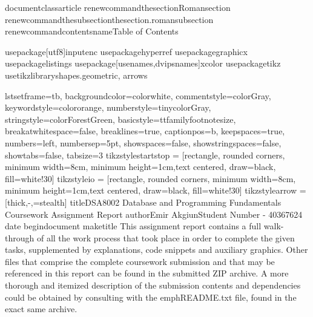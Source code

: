 documentclass{article}
renewcommandthesection{Roman{section}}
renewcommandthesubsection{thesection.roman{subsection}}
renewcommand{contentsname}{Table of Contents} 

usepackage[utf8]{inputenc}
usepackage{hyperref}
usepackage{graphicx}
usepackage{listings}
usepackage[usenames,dvipsnames]{xcolor}
usepackage{tikz}
usetikzlibrary{shapes.geometric, arrows}

lstset{frame=tb,
 backgroundcolor=color{white},   
    commentstyle=color{Gray},
    keywordstyle=color{orange},
    numberstyle=tinycolor{Gray},
    stringstyle=color{ForestGreen},
    basicstyle=ttfamilyfootnotesize,
    breakatwhitespace=false,         
    breaklines=true,                 
    captionpos=b,                    
    keepspaces=true,                 
    numbers=left,                    
    numbersep=5pt,                  
    showspaces=false,                
    showstringspaces=false,
    showtabs=false,                  
    tabsize=3}
tikzstyle{startstop} = [rectangle, rounded corners, minimum width=8cm, minimum height=1cm,text centered, draw=black, fill=white!30]
tikzstyle{io} = [rectangle, rounded corners, minimum width=8cm, minimum height=1cm,text centered, draw=black, fill=white!30]
tikzstyle{arrow} = [thick,-,=stealth]
title{DSA8002 Database and Programming Fundamentals Coursework Assignment Report}
author{Emir AkgiunStudent Number - 40367624}
date{}
begin{document}
maketitle
This assignment report contains a full walk-through of all the work process that took place in order to
complete the given tasks, supplemented by explanations, code snippets and auxiliary  graphics.
Other files that comprise the complete coursework submission and that may be referenced in this report can be found in the submitted ZIP archive. A more thorough and itemized description of the submission contents and dependencies could be obtained by consulting with the emph{README.txt} file, found in the exact same archive.

